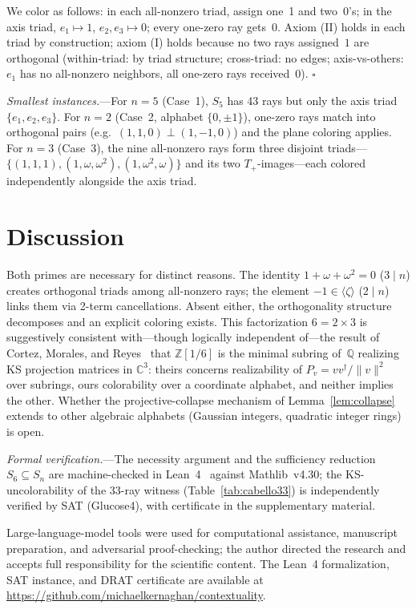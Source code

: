 \documentclass[twocolumn,prl,superscriptaddress,nofootinbib]{revtex4-2}
\newcommand{\C}{\mathbb{C}}
\newcommand{\Z}{\mathbb{Z}}
\newcommand{\Q}{\mathbb{Q}}
\begin{document}
We color as follows: in each all-nonzero triad, assign one~1 and two~0's; in the axis triad, $e_1 \mapsto 1$, $e_2, e_3 \mapsto 0$; every one-zero ray gets~0.  Axiom (II) holds in each triad by construction; axiom (I) holds because no two rays assigned~$1$ are orthogonal (within-triad: by triad structure; cross-triad: no edges; axis-vs-others: $e_1$ has no all-nonzero neighbors, all one-zero rays received~0). $\square$

\emph{Smallest instances.}---For $n = 5$ (Case~1), $S_5$ has 43 rays but only the axis triad $\{e_1, e_2, e_3\}$.  For $n = 2$ (Case~2, alphabet $\{0, \pm 1\}$), one-zero rays match into orthogonal pairs (e.g.\ $(1,1,0) \perp (1,-1,0)$) and the plane coloring applies.  For $n = 3$ (Case~3), the nine all-nonzero rays form three disjoint triads---$\{(1,1,1), (1,\omega,\omega^2), (1,\omega^2,\omega)\}$ and its two $T_+$-images---each colored independently alongside the axis triad.

\section{Discussion}

Both primes are necessary for distinct reasons.  The identity $1 + \omega + \omega^2 = 0$ ($3 \mid n$) creates orthogonal triads among all-nonzero rays; the element $-1 \in \langle\zeta\rangle$ ($2 \mid n$) links them via 2-term cancellations.  Absent either, the orthogonality structure decomposes and an explicit coloring exists.  This factorization $6 = 2 \times 3$ is suggestively consistent with---though logically independent of---the result of Cortez, Morales, and Reyes~\cite{CortezMoralesReyes2022} that $\Z[1/6]$ is the minimal subring of~$\Q$ realizing KS projection matrices in $\C^3$: theirs concerns realizability of $P_v = vv^\dagger / \|v\|^2$ over subrings, ours colorability over a coordinate alphabet, and neither implies the other.  Whether the projective-collapse mechanism of Lemma~\ref{lem:collapse} extends to other algebraic alphabets (Gaussian integers, quadratic integer rings) is open.

\textit{Formal verification.}---The necessity argument and the sufficiency reduction $S_6 \subseteq S_n$ are machine-checked in Lean~4~\cite{Lean4} against Mathlib~v4.30; the KS-uncolorability of the 33-ray witness (Table~\ref{tab:cabello33}) is independently verified by SAT (Glucose4), with certificate in the supplementary material.

\begin{acknowledgments}
Large-language-model tools were used for computational assistance, manuscript preparation, and adversarial proof-checking; the author directed the research and accepts full responsibility for the scientific content.  The Lean~4 formalization, SAT instance, and DRAT certificate are available at \url{https://github.com/michaelkernaghan/contextuality}.
\end{acknowledgments}
\end{document}
